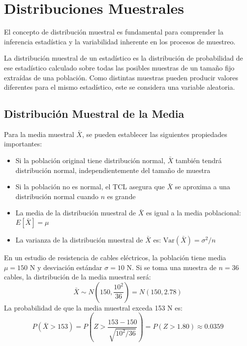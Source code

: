 \section{Distribuciones Muestrales}

El concepto de distribución muestral es fundamental para comprender la inferencia estadística y la variabilidad inherente en los procesos de muestreo.

\begin{definition}
La distribución muestral de un estadístico es la distribución de probabilidad de ese estadístico calculado sobre todas las posibles muestras de un tamaño fijo extraídas de una población. Como distintas muestras pueden producir valores diferentes para el mismo estadístico, este se considera una variable aleatoria.
\end{definition}

\subsection{Distribución Muestral de la Media}

\begin{remark}
Para la media muestral $\bar{X}$, se pueden establecer las siguientes propiedades importantes:
\begin{itemize}
    \item Si la población original tiene distribución normal, $\bar{X}$ también tendrá distribución normal, independientemente del tamaño de muestra
    \item Si la población no es normal, el TCL asegura que $\bar{X}$ se aproxima a una distribución normal cuando $n$ es grande
    \item La media de la distribución muestral de $\bar{X}$ es igual a la media poblacional: $E[\bar{X}] = \mu$
    \item La varianza de la distribución muestral de $\bar{X}$ es: $\text{Var}(\bar{X}) = \sigma^2/n$
\end{itemize}
\end{remark}

\begin{example}
En un estudio de resistencia de cables eléctricos, la población tiene media $\mu = 150$ N y desviación estándar $\sigma = 10$ N. Si se toma una muestra de $n = 36$ cables, la distribución de la media muestral será:
\begin{equation}
\bar{X} \sim N\left(150, \frac{10^2}{36}\right) = N(150, 2.78)
\end{equation}
La probabilidad de que la media muestral exceda 153 N es:
\begin{equation}
P(\bar{X} > 153) = P\left(Z > \frac{153-150}{\sqrt{10^2/36}}\right) = P(Z > 1.80) \approx 0.0359
\end{equation}
\end{example}


